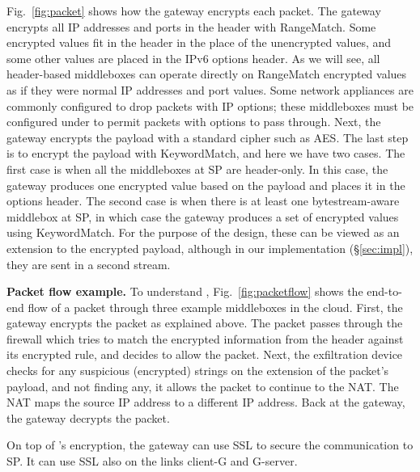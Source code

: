 Fig.~\ref{fig:packet} shows how the gateway encrypts each packet. 
The gateway encrypts all IP addresses and ports in the header with RangeMatch.
Some encrypted values fit 
in the header in the place of the unencrypted values, and
some other values are placed in the IPv6 options header. 
As we will see, all header-based middleboxes can operate directly on RangeMatch encrypted values as if they were normal IP addresses and port values.
Some network appliances are commonly configured to drop packets with IP options; these middleboxes must be configured under \sys to permit packets with \sys options to pass through.
Next, the gateway encrypts the payload  with a standard cipher such as AES.
The last step is to encrypt the payload with KeywordMatch, and here we have two cases.
The first case is when all the middleboxes at SP are header-only. In this case, the gateway produces one encrypted value based on the payload and places it in the options header. The second case is when there is at least one bytestream-aware middlebox at SP, in which case the gateway produces a set of encrypted values using KeywordMatch. For the purpose of the design, these can be viewed as an extension to the encrypted payload, although in our implementation (\S\ref{sec:impl}), they are sent in a second stream.








\smallskip
\noindent\textbf{Packet flow example.}
To understand \sys, Fig.~\ref{fig:packetflow} shows the end-to-end flow of a packet through three example middleboxes in the cloud.  First,  the gateway encrypts the packet as explained above. The packet passes through the firewall which tries to match the encrypted information from the header against its encrypted rule, and decides to allow the packet. Next, the exfiltration device checks for any suspicious (encrypted) strings on the extension of the packet's payload, and not finding any, it allows the packet  to continue to the NAT. The NAT maps the source IP address to a different IP address. Back at the gateway, the gateway decrypts the packet. 

On top of \sys's encryption, the gateway can use SSL  to secure the communication to SP.  It can use SSL also on the links client-G and G-server.


